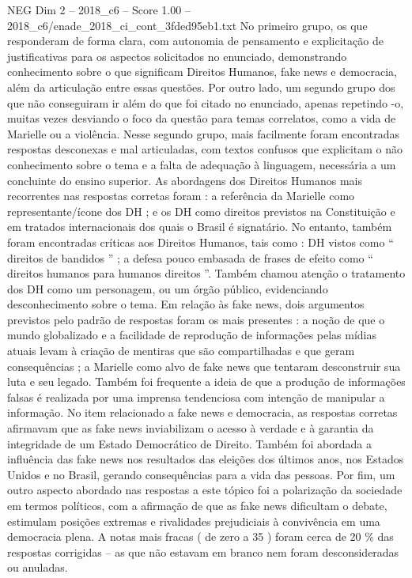\begin{textsample}{NEG Dim 2 – 2018\_c6 – Score 1.00 – 2018\_c6/enade\_2018\_ci\_cont\_3fded95eb1.txt}
No primeiro grupo, os que responderam de forma clara, com autonomia de pensamento e explicitação de justificativas para os aspectos solicitados no enunciado, demonstrando conhecimento sobre o que significam Direitos Humanos, fake news e democracia, além da articulação entre essas questões.
Por outro lado, um segundo grupo dos que não conseguiram ir além do que foi citado no enunciado, apenas repetindo -o, muitas vezes desviando o foco da questão para temas correlatos, como a vida de Marielle ou a violência.
Nesse segundo grupo, mais facilmente foram encontradas respostas desconexas e mal articuladas, com textos confusos que explicitam o não conhecimento sobre o tema e a falta de adequação à linguagem, necessária a um concluinte do ensino superior.
As abordagens dos Direitos Humanos mais recorrentes nas respostas corretas foram : a referência da Marielle como representante/ícone dos DH ; e os DH como direitos previstos na Constituição e em tratados internacionais dos quais o Brasil é signatário.
No entanto, também foram encontradas críticas aos Direitos Humanos, tais como : DH vistos como “ direitos de bandidos ” ; a defesa pouco embasada de frases de efeito como “ direitos humanos para humanos direitos ”.
Também chamou atenção o tratamento dos DH como um personagem, ou um órgão público, evidenciando desconhecimento sobre o tema.
Em relação às fake news, dois argumentos previstos pelo padrão de respostas foram os mais presentes : a noção de que o mundo globalizado e a facilidade de reprodução de informações pelas mídias atuais levam à criação de mentiras que são compartilhadas e que geram consequências ; a Marielle como alvo de fake news que tentaram desconstruir sua luta e seu legado.
Também foi frequente a ideia de que a produção de informações falsas é realizada por uma imprensa tendenciosa com intenção de manipular a informação.
No item relacionado a fake news e democracia, as respostas corretas afirmavam que as fake news inviabilizam o acesso à verdade e à garantia da integridade de um Estado Democrático de Direito.
Também foi abordada a influência das fake news nos resultados das eleições dos últimos anos, nos Estados Unidos e no Brasil, gerando consequências para a vida das pessoas.
Por fim, um outro aspecto abordado nas respostas a este tópico foi a polarização da sociedade em termos políticos, com a afirmação de que as fake news dificultam o debate, estimulam posições extremas e rivalidades prejudiciais à convivência em uma democracia plena.
A notas mais fracas ( de zero a 35 ) foram cerca de 20 \% das respostas corrigidas – as que não estavam em branco nem foram desconsideradas ou anuladas.

\end{textsample}
